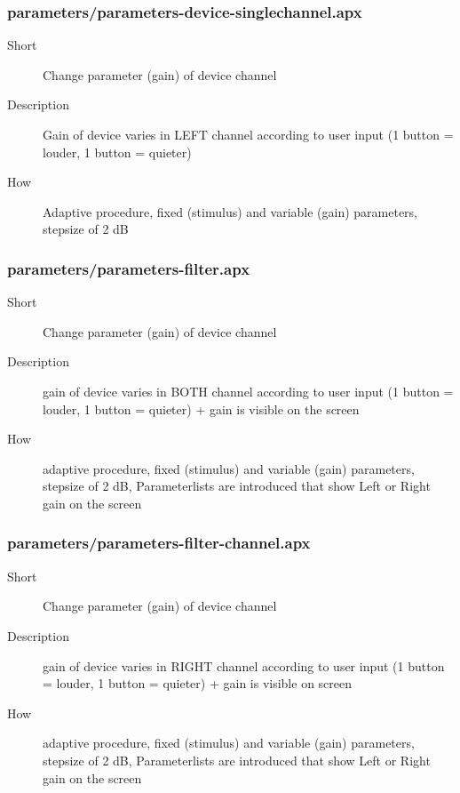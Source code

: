 \subsubsection{parameters/parameters-device-singlechannel.apx}
\begin{description}
\item[Short] 
 Change parameter (gain) of device channel
\item[Description] 
 Gain of device varies in LEFT channel according to user input (1 button = louder, 1 button = quieter)
\item[How] 
 Adaptive procedure, fixed (stimulus) and variable (gain) parameters, stepsize of 2 dB
\end{description}

\subsubsection{parameters/parameters-filter.apx}
\begin{description}
\item[Short] 
 Change parameter (gain) of device channel
\item[Description] 
 gain of device varies in BOTH channel according to user input (1 button = louder, 1 button = quieter) + gain is visible on the screen
\item[How] 
 adaptive procedure, fixed (stimulus) and variable (gain) parameters, stepsize of 2 dB, Parameterlists are introduced that show Left or Right gain on the screen
\end{description}

\subsubsection{parameters/parameters-filter-channel.apx}
\begin{description}
\item[Short] 
 Change parameter (gain) of device channel
\item[Description] 
 gain of device varies in RIGHT channel according to user input (1 button = louder, 1 button = quieter) + gain is visible on screen
\item[How] 
 adaptive procedure, fixed (stimulus) and variable (gain) parameters, stepsize of 2 dB, Parameterlists are introduced that show Left or Right gain on the screen
\end{description}

